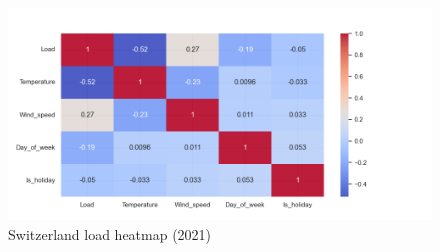 \begin{figure}[!h]
    \includegraphics[width=\textwidth]{images/CH_heatmap_2021.png}
    \caption{Switzerland load heatmap (2021)}
    \label{fig:CH_heatmap_2021}
\end{figure}